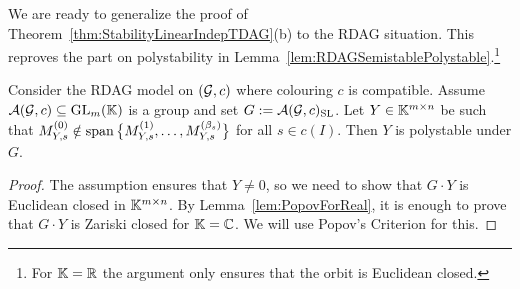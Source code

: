 We are ready to generalize the proof of Theorem~\ref{thm:StabilityLinearIndepTDAG}(b) to the RDAG situation. This reproves the part on polystability in Lemma~\ref{lem:RDAGSemistablePolystable}.\footnote{For $\mathbb K = \mathbb R$ the argument only ensures that the orbit is Euclidean closed.}

\begin{lemma}\label{lem:PopovRDAG}
	Consider the RDAG model on $(\mathcal{G}, c)$ where colouring $c$ is compatible. Assume $\mathcal{A}(\mathcal{G}, c) \subseteq \operatorname{GL}_m(\mathbb K)$ is a group and set $G := \mathcal{A}(\mathcal{G}, c)_{\operatorname{SL}}$. 
	Let $Y \in \mathbb K^{m \times n}$ be such that $M_{Y,s}^{(0)} \notin \operatorname{span} \big\lbrace M_{Y,s}^{(1)},\ldots, M_{Y,s}^{(\beta_s)} \big\rbrace$ for all $s \in c(I)$. Then $Y$ is polystable under $G$.
\end{lemma}

\begin{proof}
	The assumption ensures that $Y \neq 0$, so we need to show that $G \cdot Y$ is Euclidean closed in $\mathbb K^{m \times n}$. By Lemma~\ref{lem:PopovForReal}, it is enough to prove that $G \cdot Y$ is Zariski closed for $\mathbb K = \mathbb C$. We will use Popov's Criterion for this.
	

\end{proof}

